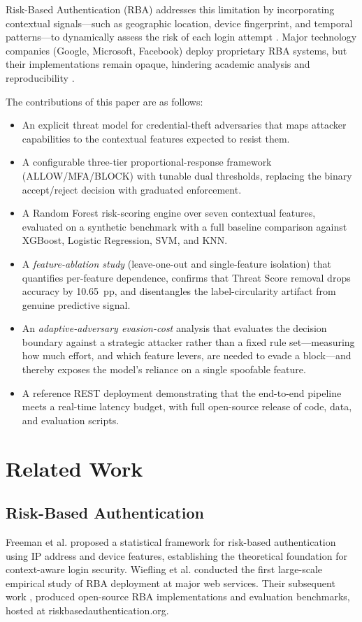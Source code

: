 \documentclass[conference]{IEEEtran}
\begin{document}
Risk-Based Authentication (RBA) addresses this limitation by incorporating contextual signals---such as geographic location, device fingerprint, and temporal patterns---to dynamically assess the risk of each login attempt \cite{wiefling2019}. Major technology companies (Google, Microsoft, Facebook) deploy proprietary RBA systems, but their implementations remain opaque, hindering academic analysis and reproducibility \cite{wiefling2021}.

The contributions of this paper are as follows:
\begin{itemize}
\item An explicit threat model for credential-theft adversaries that maps attacker capabilities to the contextual features expected to resist them.
\item A configurable three-tier proportional-response framework (ALLOW/MFA/BLOCK) with tunable dual thresholds, replacing the binary accept/reject decision with graduated enforcement.
\item A Random Forest risk-scoring engine over seven contextual features, evaluated on a synthetic benchmark with a full baseline comparison against XGBoost, Logistic Regression, SVM, and KNN.
\item A \textit{feature-ablation study} (leave-one-out and single-feature isolation) that quantifies per-feature dependence, confirms that Threat Score removal drops accuracy by 10.65~pp, and disentangles the label-circularity artifact from genuine predictive signal.
\item An \textit{adaptive-adversary evasion-cost} analysis that evaluates the decision boundary against a strategic attacker rather than a fixed rule set---measuring how much effort, and which feature levers, are needed to evade a block---and thereby exposes the model's reliance on a single spoofable feature.
\item A reference REST deployment demonstrating that the end-to-end pipeline meets a real-time latency budget, with full open-source release of code, data, and evaluation scripts.
\end{itemize}

\section{Related Work}
\subsection{Risk-Based Authentication}
Freeman et al. \cite{freeman2016} proposed a statistical framework for risk-based authentication using IP address and device features, establishing the theoretical foundation for context-aware login security. Wiefling et al. \cite{wiefling2019} conducted the first large-scale empirical study of RBA deployment at major web services. Their subsequent work \cite{wiefling2021}, \cite{unsel2023} produced open-source RBA implementations and evaluation benchmarks, hosted at riskbasedauthentication.org.
\end{document}

